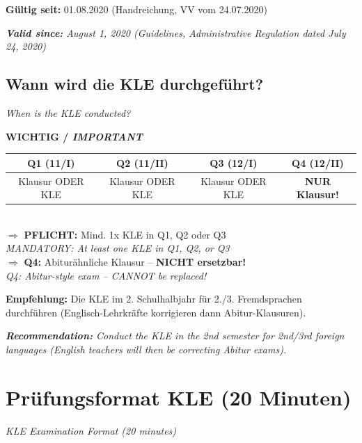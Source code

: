 \documentclass[11pt,a4paper]{article}
\newcommand{\bipar}[2]{%
    #1\par\vspace{2pt}%
    {\small\color{englishgray}\textit{#2}}\par\vspace{8pt}%
}
\newcommand{\bisection}[2]{%
    \section{#1}%
    {\small\color{englishgray}\textit{#2}}\par\vspace{6pt}%
}
\newcommand{\bisubsection}[2]{%
    \subsection{#1}%
    {\small\color{englishgray}\textit{#2}}\par\vspace{4pt}%
}
\begin{document}
\vspace{0.5cm}
\bipar{\textbf{Gültig seit:} 01.08.2020 (Handreichung, VV vom 24.07.2020)}{\textbf{Valid since:} August 1, 2020 (Guidelines, Administrative Regulation dated July 24, 2020)}

\bisubsection{Wann wird die KLE durchgeführt?}{When is the KLE conducted?}

\begin{warnbox}
\centering
\textbf{WICHTIG / \textit{IMPORTANT}}\\[0.3cm]
\begin{tabular}{|c|c|c|c|}
\hline
\rowcolor{lightgray}\textbf{Q1 (11/I)} & \textbf{Q2 (11/II)} & \textbf{Q3 (12/I)} & \textbf{Q4 (12/II)} \\
\hline
Klausur ODER KLE & Klausur ODER KLE & Klausur ODER KLE & \cellcolor{spanischrot!20}\textbf{NUR Klausur!} \\
\hline
\end{tabular}\\[0.3cm]
$\Rightarrow$ \textbf{PFLICHT:} Mind. 1x KLE in Q1, Q2 oder Q3\\
{\color{englishgray}\textit{MANDATORY: At least one KLE in Q1, Q2, or Q3}}\\[0.2cm]
$\Rightarrow$ \textbf{Q4:} Abiturähnliche Klausur -- \textbf{NICHT ersetzbar!}\\
{\color{englishgray}\textit{Q4: Abitur-style exam -- CANNOT be replaced!}}
\end{warnbox}

\bipar{\textbf{Empfehlung:} Die KLE im 2. Schulhalbjahr für 2./3. Fremdsprachen durchführen (Englisch-Lehrkräfte korrigieren dann Abitur-Klausuren).}{\textbf{Recommendation:} Conduct the KLE in the 2nd semester for 2nd/3rd foreign languages (English teachers will then be correcting Abitur exams).}

\bisection{Prüfungsformat KLE (20 Minuten)}{KLE Examination Format (20 minutes)}
\end{document}
